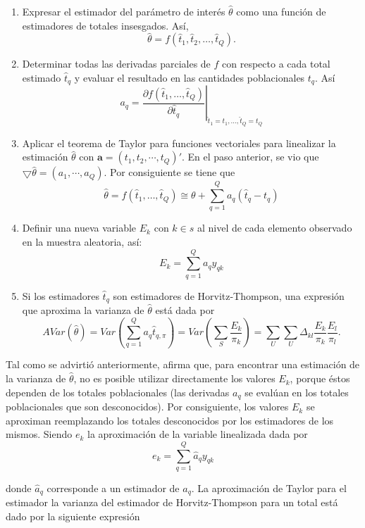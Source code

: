 \documentclass[
  12pt,
]{book}
\providecommand{\tightlist}{%
  \setlength{\itemsep}{0pt}\setlength{\parskip}{0pt}}
\begin{document}
\begin{enumerate}
\def\labelenumi{\arabic{enumi}.}
\tightlist
\item
  Expresar el estimador del parámetro de interés \(\hat{\theta}\) como una función de estimadores de totales insesgados. Así,
  \[
  \hat{\theta}=f(\hat{t}_1, \hat{t}_2,\ldots,\hat{t}_Q).
  \]
\item
  Determinar todas las derivadas parciales de \(f\) con respecto a cada total estimado \(\hat{t}_{q}\) y evaluar el resultado en las cantidades poblacionales \(t_q\). Así
  \[
  a_q=\left.\dfrac{\partial f(\hat{t}_1,\ldots,\hat{t}_Q)}{\partial \hat{t}_{q}}\right|_{\hat{t}_1=t_1,\ldots,\hat{t}_Q=t_Q}
  \]
\item
  Aplicar el teorema de Taylor para funciones vectoriales para linealizar la estimación \(\hat{\theta}\) con \(\mathbf{a}=(t_1,t_2,\cdots,t_Q)'\). En el paso anterior, se vio que \(\bigtriangledown\hat{\theta}=(a_1,\cdots,a_Q)\). Por consiguiente se tiene que
  \[
  \hat{\theta}=f(\hat{t}_1,\ldots,\hat{t}_Q) \cong \theta +\sum_{q=1}^Qa_q(\hat{t}_{q}-t_q)
  \]
\item
  Definir una nueva variable \(E_k\) con \(k\in s\) al nivel de cada elemento observado en la muestra aleatoria, así:
  \[
  E_k=\sum_{q=1}^Qa_qy_{qk}
  \]
\item
  Si los estimadores \(\hat{t}_{q}\) son estimadores de Horvitz-Thompson, una expresión que aproxima la varianza de \(\hat{\theta}\) está dada por
  \[
  AVar(\hat{\theta})=Var\left(\sum_{q=1}^Qa_q\hat{t}_{q,\pi}\right)
  =Var\left(\sum_S\frac{E_k}{\pi_k}\right)=\sum_U\sum_U\Delta_{kl}\frac{E_k}{\pi_k}\frac{E_l}{\pi_l}.
  \]
\end{enumerate}

Tal como se advirtió anteriormente, \citet{Gutierrez_2016} afirma que, para encontrar una estimación de la varianza de \(\hat{\theta}\), no es posible utilizar directamente los valores \(E_k\), porque éstos dependen de los totales poblacionales (las derivadas \(a_q\) se evalúan en los totales poblacionales que son desconocidos). Por consiguiente, los valores \(E_k\) se aproximan reemplazando los totales desconocidos por los estimadores de los mismos. Siendo \(e_k\) la aproximación de la variable linealizada dada por
\[
e_k=\sum_{q=1}^Q\hat{a}_qy_{qk}
\]

donde \(\hat{a}_q\) corresponde a un estimador de \(a_q\). La aproximación de Taylor para el estimador la varianza del estimador de Horvitz-Thompson para un total está dado por la siguiente expresión
\end{document}
